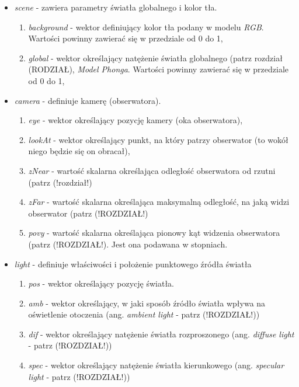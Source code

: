 \begin{itemize}

\item \emph{scene} - zawiera parametry światła globalnego i kolor tła.
	\begin{enumerate}
		\item \emph{background} - wektor definiujący kolor tła podany w modelu \emph{RGB}. Wartości powinny zawierać się w przedziale od 0 do 1,
		\item \emph{global} -  wektor określający natężenie światła globalnego (patrz rozdział (RODZIAŁ), \emph{Model Phonga}. Wartości powinny zawierać się w przedziale od 0 do 1,
	\end{enumerate}
	
\item \emph{camera} - definiuje kamerę (obserwatora).

	\begin{enumerate}
		\item \emph{eye} - wektor określający pozycję kamery (oka obserwatora),
		\item \emph{lookAt} - wektor określający punkt, na który patrzy obserwator (to wokół niego będzie się on obracał),
		\item \emph{zNear} - wartość skalarna określająca odległość obserwatora od rzutni (patrz (!rozdział!)
		\item \emph{zFar} -	wartość skalarna określająca maksymalną odległość, na jaką widzi obserwator (patrz (!ROZDZIAŁ!)
		\item \emph{povy} -	wartość skalarna określająca pionowy kąt widzenia obserwatora (patrz (!ROZDZIAŁ!). Jest ona podawana w stopniach.
	\end{enumerate}

\item \emph{light} - definiuje właściwości i położenie punktowego źródła światła

	\begin{enumerate}
		\item \emph{pos} - wektor określający pozycję światła.
		\item \emph{amb} - wektor określający, w jaki sposób źródło światła wpływa na oświetlenie otoczenia (ang. \emph{ambient light} - patrz (!ROZDZIAŁ!))
		\item \emph{dif} - wektor określający natężenie światła rozproszonego (ang. \emph{diffuse light} - patrz (!ROZDZIAŁ!))
		\item \emph{spec} - wektor określający natężenie światła kierunkowego (ang. \emph{specular light} - patrz (!ROZDZIAŁ!))
	\end{enumerate}


\end{itemize}
